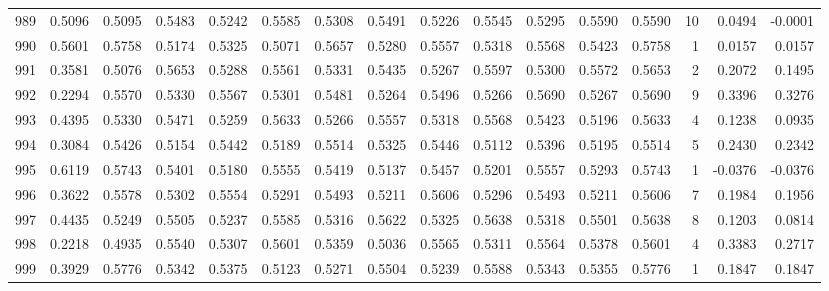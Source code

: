 \begin{tabular}{lrrrrrrrrrrrrrrr}
989 &      0.5096 &  0.5095 &  0.5483 &  0.5242 &  0.5585 &  0.5308 &  0.5491 &  0.5226 &  0.5545 &  0.5295 &   0.5590 &     0.5590 &     10 &                    0.0494 &                    -0.0001 \\
990 &      0.5601 &  0.5758 &  0.5174 &  0.5325 &  0.5071 &  0.5657 &  0.5280 &  0.5557 &  0.5318 &  0.5568 &   0.5423 &     0.5758 &      1 &                    0.0157 &                     0.0157 \\
991 &      0.3581 &  0.5076 &  0.5653 &  0.5288 &  0.5561 &  0.5331 &  0.5435 &  0.5267 &  0.5597 &  0.5300 &   0.5572 &     0.5653 &      2 &                    0.2072 &                     0.1495 \\
992 &      0.2294 &  0.5570 &  0.5330 &  0.5567 &  0.5301 &  0.5481 &  0.5264 &  0.5496 &  0.5266 &  0.5690 &   0.5267 &     0.5690 &      9 &                    0.3396 &                     0.3276 \\
993 &      0.4395 &  0.5330 &  0.5471 &  0.5259 &  0.5633 &  0.5266 &  0.5557 &  0.5318 &  0.5568 &  0.5423 &   0.5196 &     0.5633 &      4 &                    0.1238 &                     0.0935 \\
994 &      0.3084 &  0.5426 &  0.5154 &  0.5442 &  0.5189 &  0.5514 &  0.5325 &  0.5446 &  0.5112 &  0.5396 &   0.5195 &     0.5514 &      5 &                    0.2430 &                     0.2342 \\
995 &      0.6119 &  0.5743 &  0.5401 &  0.5180 &  0.5555 &  0.5419 &  0.5137 &  0.5457 &  0.5201 &  0.5557 &   0.5293 &     0.5743 &      1 &                   -0.0376 &                    -0.0376 \\
996 &      0.3622 &  0.5578 &  0.5302 &  0.5554 &  0.5291 &  0.5493 &  0.5211 &  0.5606 &  0.5296 &  0.5493 &   0.5211 &     0.5606 &      7 &                    0.1984 &                     0.1956 \\
997 &      0.4435 &  0.5249 &  0.5505 &  0.5237 &  0.5585 &  0.5316 &  0.5622 &  0.5325 &  0.5638 &  0.5318 &   0.5501 &     0.5638 &      8 &                    0.1203 &                     0.0814 \\
998 &      0.2218 &  0.4935 &  0.5540 &  0.5307 &  0.5601 &  0.5359 &  0.5036 &  0.5565 &  0.5311 &  0.5564 &   0.5378 &     0.5601 &      4 &                    0.3383 &                     0.2717 \\
999 &      0.3929 &  0.5776 &  0.5342 &  0.5375 &  0.5123 &  0.5271 &  0.5504 &  0.5239 &  0.5588 &  0.5343 &   0.5355 &     0.5776 &      1 &                    0.1847 &                     0.1847 \\
\bottomrule
\end{tabular}
